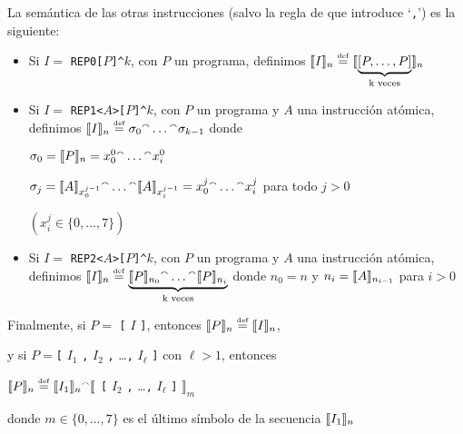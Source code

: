 La semántica de las otras instrucciones (salvo la regla de que introduce `\verb#,#') es la siguiente:
\begin{itemize}
\item Si $I=$ \verb#REP0[#$P$\verb#]^#$k$, con $P$ un programa, 
definimos 
$\llbracket I\rrbracket_n \stackrel{\scriptscriptstyle \mathrm{def}}{=} \llbracket \underbrace{[P,\dots,P]}_\text{k veces}\rrbracket_n $


\item Si $I=$ \verb#REP1<#$A$\verb#>[#$P$\verb#]^#$k$, con $P$ un programa y $A$ una instrucción atómica, 
definimos 
$\llbracket I\rrbracket_n \stackrel{\scriptscriptstyle \mathrm{def}}{=}  \sigma_0 {}^\smallfrown \dots {}^\smallfrown \sigma_{k-1}$ donde
      
      $\sigma_0 = \llbracket P\rrbracket_n = x_0^0 {}^\smallfrown \dots {}^\smallfrown x_i^0$
      
      $\sigma_j = \llbracket A\rrbracket_{x_0^{j-1}} {}^\smallfrown \dots {}^\smallfrown \llbracket A\rrbracket_{x_i^{j-1}} = x_0^j {}^\smallfrown \dots {}^\smallfrown x_i^j$ para todo $j>0$ 
      
      $(x_i^j \in\{0,\dots,7\})$

\item Si $I=$ \verb#REP2<#$A$\verb#>[#$P$\verb#]^#$k$, con $P$ un programa y $A$ una instrucción atómica, 
definimos 
$\llbracket I\rrbracket_n \stackrel{\scriptscriptstyle \mathrm{def}}{=} \underbrace{\llbracket P\rrbracket_{n_0} {}^\smallfrown \dots {}^\smallfrown \llbracket P\rrbracket_{n_i}}_\text{k veces}$ donde $n_0 = n$ y $n_i = \llbracket A\rrbracket_{n_{i-1}}$ para $i>0$ 
\end{itemize}

Finalmente, si $P=$ \verb#[# $I$ \verb#]#, entonces $\llbracket P\rrbracket_n\stackrel{\scriptscriptstyle \mathrm{def}}{=}\llbracket I\rrbracket_n$, 

y si $P=$\verb#[# $I_1$ \verb#,# $I_2$ \verb#,# \dots \verb#,# $I_\ell$ \verb#]# con $\ell>1$, entonces

\begin{center}
$\llbracket P\rrbracket_n \stackrel{\scriptscriptstyle \mathrm{def}}{=} \llbracket I_1\rrbracket_n {}^\smallfrown \llbracket$
\verb#[# $I_2$ \verb#,# \dots \verb#,# $I_\ell$ \verb#]#
$\rrbracket_m$
\end{center}

\noindent donde $m\in\{0,\dots,7\}$ es el último símbolo de la secuencia $\llbracket I_1\rrbracket_n$ 


